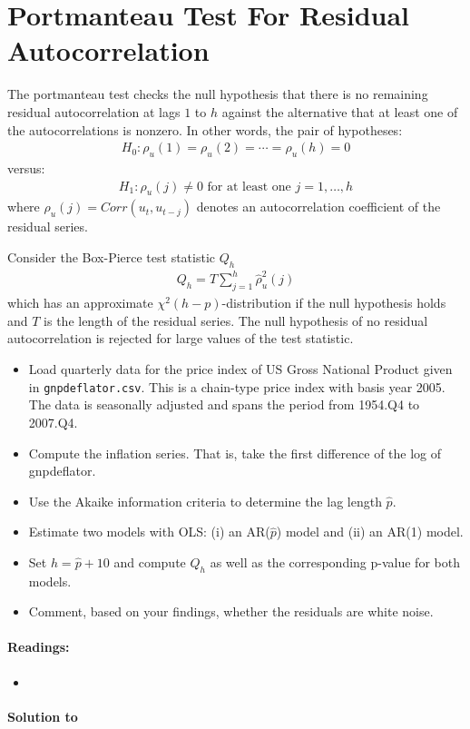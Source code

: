 \section[Portmanteau Test For Residual Autocorrelation]{Portmanteau Test For Residual Autocorrelation\label{ex:PortmanteauTestResidualAutocorrelation}}
The portmanteau test checks the null hypothesis
  that there is no remaining residual autocorrelation at lags \(1\) to \(h\)
  against the alternative that at least one of the autocorrelations is nonzero.
In other words, the pair of hypotheses:
\begin{align*}
H_0:\rho_u(1)=\rho_u(2)=\cdots =\rho_u(h) = 0
\end{align*}
versus:
\begin{align*}
H_1: \rho_u(j) \neq 0 \text{~for at least one~} j=1,\ldots ,h
\end{align*}
where \(\rho_u(j) = Corr(u_t, u_{t-j})\) denotes an autocorrelation coefficient of the residual series.

Consider the Box-Pierce test statistic \(Q_h\)
\begin{align*}
Q_h = T \sum_{j=1}^h \hat{\rho}^2_u(j)
\end{align*}
which has an approximate \(\chi^2(h-p)\)-distribution if the null hypothesis holds
  and \(T\) is the length of the residual series.
The null hypothesis of no residual autocorrelation is rejected for large values of the test statistic.

\begin{itemize}

\item
Load quarterly data for the price index of US Gross National Product given in \texttt{gnpdeflator.csv}.
This is a chain-type price index with basis year 2005.
The data is seasonally adjusted and spans the period from 1954.Q4 to 2007.Q4.

\item
Compute the inflation series.
That is, take the first difference of the log of gnpdeflator.

\item
Use the Akaike information criteria to determine the lag length \(\hat{p}\).

\item
Estimate two models with {OLS}:
  (i) an AR{(\(\hat{p}\))} model and
  (ii) an AR{(1)} model.

\item
Set \(h=\hat{p}+10\) and compute \(Q_h\) as well as the corresponding p-value for both models.

\item
Comment, based on your findings, whether the residuals are white noise.
\end{itemize}

\paragraph{Readings:}
\begin{itemize}
\item \textcite{Lutkepohl_2004_UnivariateTimeSeries}
\end{itemize}

\begin{solution}\textbf{Solution to }
\ifDisplaySolutions%

\fi
\newpage
\end{solution}